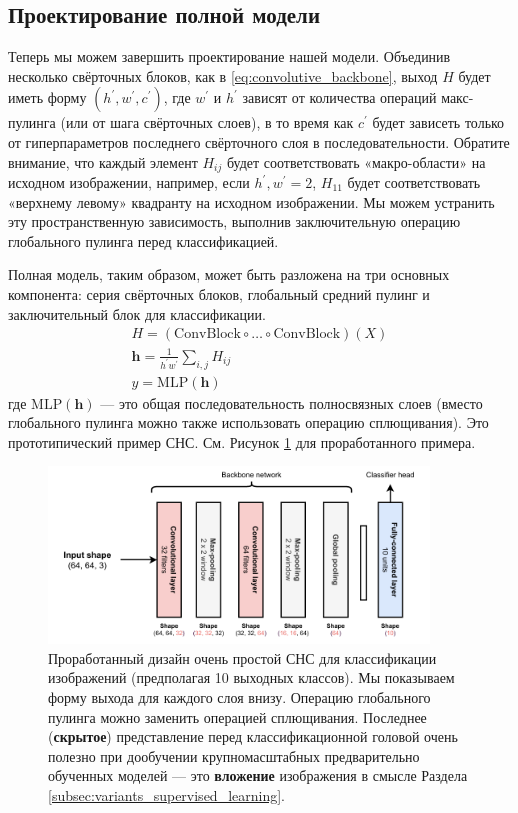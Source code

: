 \subsection{Проектирование полной модели}

Теперь мы можем завершить проектирование нашей модели. Объединив несколько свёрточных блоков, как в \eqref{eq:convolutive_backbone}, выход $H$ будет иметь форму $(h^\prime, w^\prime, c^\prime)$, где $w^\prime$ и $h^\prime$ зависят от количества операций макс-пулинга (или от шага свёрточных слоев), в то время как $c^\prime$ будет зависеть только от гиперпараметров последнего свёрточного слоя в последовательности. Обратите внимание, что каждый элемент $H_{ij}$ будет соответствовать «макро-области» на исходном изображении, например, если $h^\prime, w^\prime = 2$, $H_{11}$ будет соответствовать «верхнему левому» квадранту на исходном изображении. Мы можем устранить эту пространственную зависимость, выполнив заключительную операцию глобального пулинга перед классификацией. 

Полная модель, таким образом, может быть разложена на три основных компонента: серия свёрточных блоков, глобальный средний пулинг и заключительный блок для классификации.
%
\begin{align} 
H = (\text{ConvBlock}\circ\ldots\circ\text{ConvBlock})(X) \label{eq:conv_blocks} \\
\mathbf{h}= \frac{1}{h^\prime w^\prime}\sum_{i,j}H_{ij}  \label{eq:global_avg_pooling} \\
y=\text{MLP}(\mathbf{h}) \label{eq:classification_head}
\end{align}
%
где $\text{MLP}(\mathbf{h})$ — это общая последовательность полносвязных слоев (вместо глобального пулинга можно также использовать операцию сплющивания). Это прототипический пример СНС. См. Рисунок \ref{fig:cnn_architecture} для проработанного примера.

\begin{figure}
    \centering
    \includegraphics[width=0.9\textwidth]{images/CNN_architecture}
    \caption{Проработанный дизайн очень простой СНС для классификации изображений (предполагая 10 выходных классов). Мы показываем форму выхода для каждого слоя внизу. Операцию глобального пулинга можно заменить операцией сплющивания. Последнее (\textbf{скрытое}) представление перед классификационной головой очень полезно при дообучении крупномасштабных предварительно обученных моделей — это \textbf{вложение} изображения в смысле Раздела \ref{subsec:variants_supervised_learning}.}
    \label{fig:cnn_architecture}
\end{figure}

